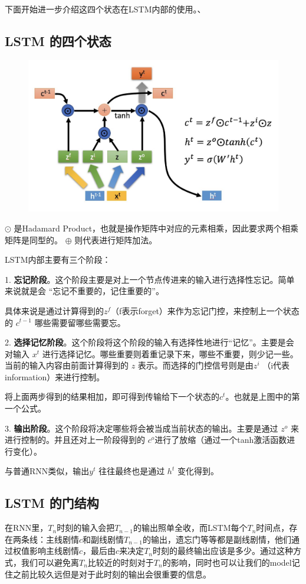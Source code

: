 \documentclass[12pt]{article}
\begin{document}
下面开始进一步介绍这四个状态在LSTM内部的使用。、
\subsection{LSTM 的四个状态}
\begin{figure}[H]
    \centering
    \includegraphics[width=.8\textwidth]{fig/LSTM_Four_States_Detail.png}
\end{figure}

$\odot$ 是Hadamard Product，也就是操作矩阵中对应的元素相乘，因此要求两个相乘矩阵是同型的。 $\oplus$ 则代表进行矩阵加法。

LSTM内部主要有三个阶段：

1. \textbf{忘记阶段}。这个阶段主要是对上一个节点传进来的输入进行选择性忘记。简单来说就是会 “忘记不重要的，记住重要的”。

具体来说是通过计算得到的$z^f$（f表示forget）来作为忘记门控，来控制上一个状态的 $c^{t-1}$ 哪些需要留哪些需要忘。

2. \textbf{选择记忆阶段}。这个阶段将这个阶段的输入有选择性地进行“记忆”。主要是会对输入 $x^t$ 进行选择记忆。哪些重要则着重记录下来，哪些不重要，则少记一些。当前的输入内容由前面计算得到的 $z$ 表示。而选择的门控信号则是由$z^i$ （i代表information）来进行控制。

将上面两步得到的结果相加，即可得到传输给下一个状态的$c^t$。也就是上图中的第一个公式。

3. \textbf{输出阶段}。这个阶段将决定哪些将会被当成当前状态的输出。主要是通过 $z^o$ 来进行控制的。并且还对上一阶段得到的 $c^o$进行了放缩（通过一个tanh激活函数进行变化）。

与普通RNN类似，输出$y^t$ 往往最终也是通过 $h^t$ 变化得到。

\subsection{LSTM 的门结构\cite{LSTM_Principle_And_Practice}}
在RNN里，$T_n$时刻的输入会把$T_{n-1}$的输出照单全收，而LSTM每个$T_n$时间点，存在两条线：主线剧情$c$和副线剧情$T_{n-1}$的输出，遗忘门等等都是副线剧情，他们通过权值影响主线剧情$c$，最后由$c$来决定$T_n$时刻的最终输出应该是多少。通过这种方式，我们可以避免离$T_n$比较近的时刻对于$T_n$的影响，同时也可以让我们的model记住之前比较久远但是对于此时刻的输出会很重要的信息。
\end{document}

